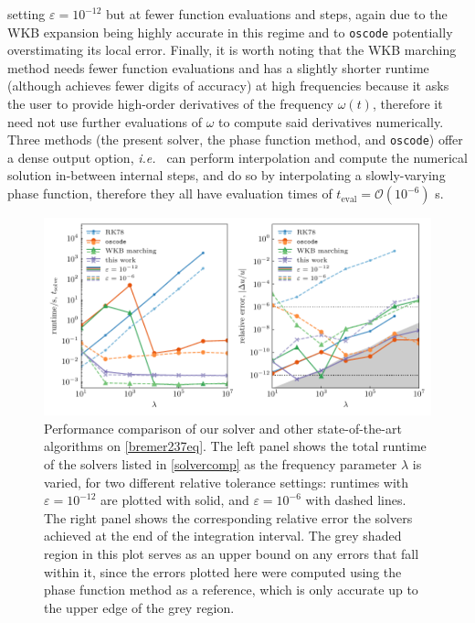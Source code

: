\documentclass[10pt]{article}
\newcommand{\ie}{{\it i.e.\ }}
\newcommand{\om}{\omega}
\begin{document}
setting $\varepsilon = 10^{-12}$ but at fewer function evaluations and steps,
again due to the WKB expansion being highly accurate in this regime and to
\texttt{oscode} potentially overstimating its local error. Finally, it is worth
noting that the WKB marching method needs fewer function evaluations and has a
slightly shorter runtime (although achieves fewer digits of accuracy) at high
frequencies because it asks the user to provide high-order derivatives of the
frequency $\om(t)$, therefore it need not use further evaluations of $\om$ to
compute said derivatives numerically. Three methods (the present solver, the
phase function method, and \texttt{oscode}) offer a dense output option, \ie
can perform interpolation and compute the numerical solution in-between
internal steps, and do so by interpolating a slowly-varying phase function,
therefore they all have evaluation times of $t_{\text{eval}} =
\mathcal{O}(10^{-6})$ \si{\s}.  

\begin{figure}[tb]
    \centering
    \includegraphics{plots/bremer237-timing.pdf}
    \caption{\label{bremer237-timing} Performance comparison of our solver and
    other state-of-the-art algorithms on \cref{bremer237eq}. The left panel
    shows the total runtime of the solvers listed in \cref{solvercomp} as the
    frequency parameter $\lambda$ is varied, for two different relative
    tolerance settings: runtimes with $\varepsilon = 10^{-12}$ are plotted with
    solid, and $\varepsilon = 10^{-6}$ with dashed lines. The right panel shows
    the corresponding relative error the solvers achieved at the end of the
    integration interval. The grey shaded region in this plot serves as an
    upper bound on any errors that fall within it, since the errors plotted
    here were computed using the phase function method as a reference, which is
    only accurate up to the upper edge of the grey region.}
\end{figure}
\end{document}
